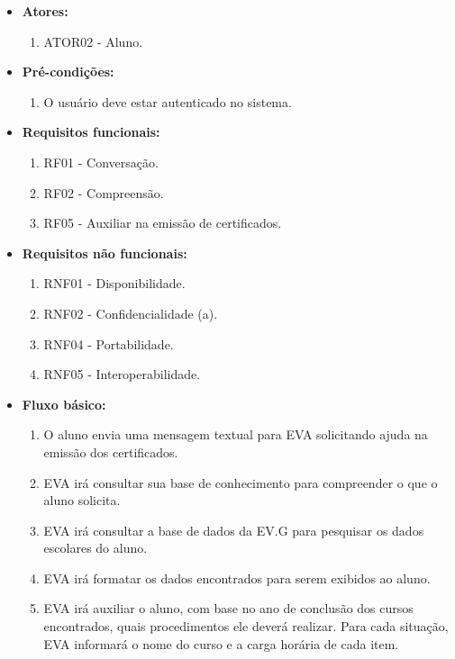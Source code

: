 \begin{itemize}
    \item \textbf{Atores:}
        \begin{enumerate}
            \item ATOR02 - Aluno.
        \end{enumerate}
    \item \textbf{Pré-condições:}
        \begin{enumerate}
            \item O usuário deve estar autenticado no sistema.
        \end{enumerate}
    \item \textbf{Requisitos funcionais:}
        \begin{enumerate}
            \item RF01 - Conversação.
            \item RF02 - Compreensão.
            \item RF05 - Auxiliar na emissão de certificados.
        \end{enumerate}
    \item \textbf{Requisitos não funcionais:}
        \begin{enumerate}
            \item RNF01 - Disponibilidade.
            \item RNF02 - Confidencialidade (a).
            \item RNF04 - Portabilidade.
            \item RNF05 - Interoperabilidade.
        \end{enumerate}
    \item \textbf{Fluxo básico:}
        \begin{enumerate}
            \item O aluno envia uma mensagem textual para EVA solicitando ajuda na emissão dos certificados.
            \item EVA irá consultar sua base de conhecimento para compreender o que o aluno solicita.
            \item EVA irá consultar a base de dados da EV.G para pesquisar os dados escolares do aluno.
            \item EVA irá formatar os dados encontrados para serem exibidos ao aluno.
            \item EVA irá auxiliar o aluno, com base no ano de conclusão dos cursos encontrados, quais procedimentos ele deverá realizar. Para cada situação, EVA informará o nome do curso e a carga horária de cada item.

\end{enumerate}
\end{itemize}

